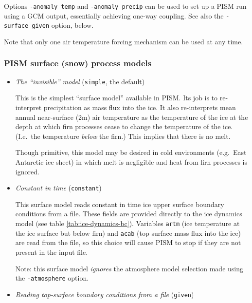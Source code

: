  Options \texttt{-anomaly_temp} and \texttt{-anomaly_precip} can be used to set up a PISM run using a GCM output, essentially achieving one-way coupling. See also the \texttt{-surface given} option, below.

  Note that only one air temperature forcing mechanism can be used at any time.  %

\subsubsection{PISM surface (snow) process models}
\label{sec:pism-surface-snow}

\begin{itemize}
  \item \emph{The ``invisible'' model} (\texttt{simple}, the default)

    This is the simplest ``surface model'' available in PISM.  Its job is to re-interpret  precipitation as mass flux into the ice.  It also re-interprets mean annual near-surface (2m) air temperature as the temperature of the ice at the depth at which firn processes cease to change the temperature of the ice.  (I.e.~the temperature \emph{below} the firn.)  This implies that there is no melt.

    Though primitive, this model may be desired in cold environments (e.g.~East Antarctic ice sheet) in which melt is negligible and heat from firn processes is ignored.

  \item \emph{Constant in time} (\texttt{constant})

    This surface model reads constant in time ice upper surface boundary conditions from a file.  These fields are provided directly to the ice dynamics model (see table \ref{tab:ice-dynamics-bc}).  Variables \texttt{artm} (ice temperature at the ice surface but below firn) and \texttt{acab} (top surface mass flux into the ice) are read from the file, so this choice will cause PISM to stop if they are not present in the input file.

    Note: this surface model \emph{ignores} the atmosphere model selection made using the \texttt{-atmosphere} option.

  \item \emph{Reading top-surface boundary conditions from a file} (\texttt{given})


\end{itemize}
